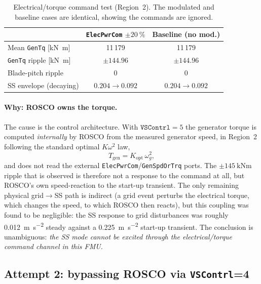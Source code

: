\begin{table}[t]
  \centering
  \caption{Electrical/torque command test (Region~2). The modulated and
  baseline cases are identical, showing the commands are ignored.}
  \label{tab:of-electrical}
  \begin{tabular}{lcc}
    \toprule
     & \texttt{ElecPwrCom} $\pm\SI{20}{\percent}$ & Baseline (no mod.) \\
    \midrule
    Mean \texttt{GenTq} [\si{\kilo\newton\metre}]   & 11\,179 & 11\,179 \\
    \texttt{GenTq} ripple [\si{\kilo\newton\metre}] & $\pm 144.96$ & $\pm 144.96$ \\
    Blade-pitch ripple                              & 0 & 0 \\
    SS envelope (decaying)                          & $0.204 \to 0.092$ & $0.204 \to 0.092$ \\
    \bottomrule
  \end{tabular}
\end{table}

\paragraph{Why: ROSCO owns the torque.}
The cause is the control architecture. With $\texttt{VSContrl}=5$ the generator
torque is computed \emph{internally} by ROSCO from the measured generator speed,
in Region~2 following the standard optimal $K\omega^2$ law,
\begin{equation}
  T_{\mathrm{gen}} = K_{\mathrm{opt}}\,\omega_{g}^{2},
  \label{eq:komega2}
\end{equation}
and does not read the external \texttt{ElecPwrCom}/\texttt{GenSpdOrTrq} ports.
The $\pm\SI{145}{\kilo\newton\metre}$ ripple that is observed is therefore not a
response to the command at all, but ROSCO's own speed-reaction to the start-up
transient. The only remaining physical grid$\to$SS path is indirect (a grid
event perturbs the electrical torque, which changes the speed, to which ROSCO
then reacts), but this coupling was found to be negligible: the SS response to
grid disturbances was roughly \SI{0.012}{\metre\per\second\squared} steady
against a \SI{0.225}{\metre\per\second\squared} start-up transient. The
conclusion is unambiguous: \emph{the SS mode cannot be excited through the
electrical/torque command channel in this FMU.}

\subsection{Attempt 2: bypassing ROSCO via \texttt{VSContrl}=4}
\label{subsec:of-vscontrl4}

